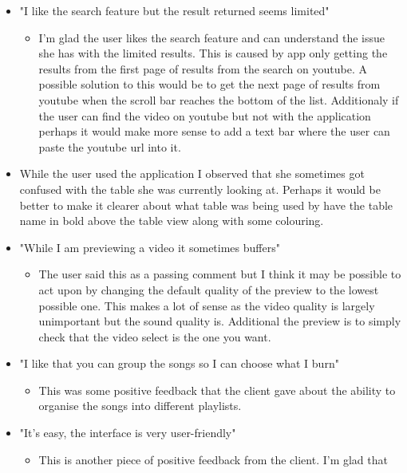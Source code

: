 \documentclass{article}
\begin{document}
\begin{itemize}
    \item "I like the search feature but the result returned seems limited"
    \begin{itemize}
        \item I'm glad the user likes the search feature and can understand the issue
            she has with the limited results. This is caused by app only getting the results
            from the first page of results from the search on youtube. A possible solution
            to this would be to get the next page of results from youtube when the scroll bar
            reaches the bottom of the list. Additionaly if the user can find the video
            on youtube but not with the application perhaps it would make more sense to
            add a text bar where the user can paste the youtube url into it.
    \end{itemize}
    \item While the user used the application I observed that she sometimes got confused with the
        table she was currently looking at. Perhaps it would be better to make it clearer
        about what table was being used by have the table name in bold above the table
        view along with some colouring.
    \item "While I am previewing a video it sometimes buffers"
    \begin{itemize}
        \item The user said this as a passing comment but I think it may be possible to act upon
            by changing the default quality of the preview to the lowest possible one. This
            makes a lot of sense as the video quality is largely unimportant but the sound
            quality is. Additional the preview is to simply check that the video select
            is the one you want.
    \end{itemize}
    \item "I like that you can group the songs so I can choose what I burn"
    \begin{itemize}
        \item This was some positive feedback that the client gave about the ability to
            organise the songs into different playlists.
    \end{itemize}
    \item "It's easy, the interface is very user-friendly"
    \begin{itemize}
        \item This is another piece of positive feedback from the client. I'm glad that

\end{itemize}
\end{itemize}
\end{document}
